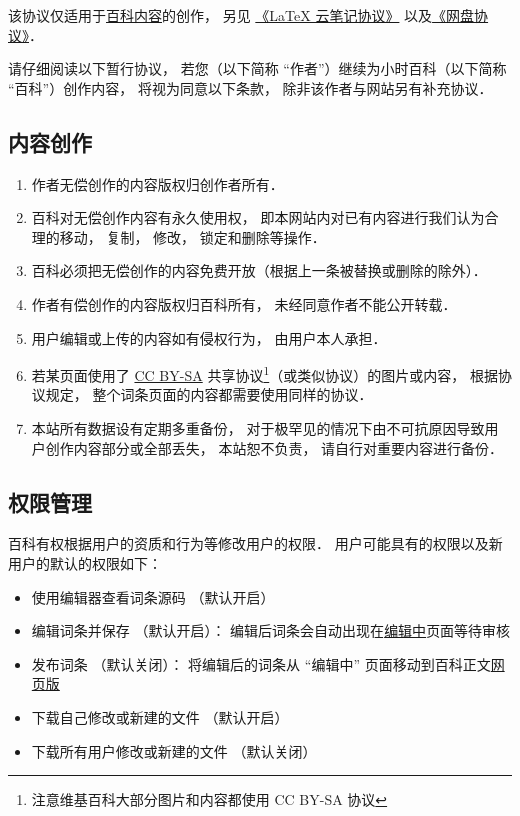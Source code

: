 
该协议仅适用于\href{http://wuli.wiki/online/}{百科内容}的创作， 另见 \href{http://wuli.wiki/online/NtLcns.html}{《LaTeX 云笔记协议》} 以及\href{http://www.example.com}{《网盘协议》}．

请仔细阅读以下暂行协议， 若您（以下简称 “作者”）继续为小时百科（以下简称 “百科”）创作内容， 将视为同意以下条款， 除非该作者与网站另有补充协议．

\subsection{内容创作}
\begin{enumerate}
\item 作者无偿创作的内容版权归创作者所有．
\item 百科对无偿创作内容有永久使用权， 即本网站内对已有内容进行我们认为合理的移动， 复制， 修改， 锁定和删除等操作．
\item 百科必须把无偿创作的内容免费开放（根据上一条被替换或删除的除外）．
\item 作者有偿创作的内容版权归百科所有， 未经同意作者不能公开转载．
\item 用户编辑或上传的内容如有侵权行为， 由用户本人承担．

\item 若某页面使用了 \href{https://creativecommons.org/licenses/by-sa/3.0/}{CC BY-SA} 共享协议\footnote{注意维基百科大部分图片和内容都使用 CC BY-SA 协议}（或类似协议）的图片或内容， 根据协议规定， 整个词条页面的内容都需要使用同样的协议．
\item 本站所有数据设有定期多重备份， 对于极罕见的情况下由不可抗原因导致用户创作内容部分或全部丢失， 本站恕不负责， 请自行对重要内容进行备份．
\end{enumerate}

\subsection{权限管理}
百科有权根据用户的资质和行为等修改用户的权限． 用户可能具有的权限以及新用户的默认的权限如下：
\begin{itemize}
\item 使用编辑器查看词条源码 （默认开启）
\item 编辑词条并保存 （默认开启）： 编辑后词条会自动出现在\href{http://wuli.wiki/changed}{编辑中}页面等待审核
\item 发布词条 （默认关闭）： 将编辑后的词条从 “编辑中” 页面移动到百科正文\href{http://wuli.wiki/online}{网页版}
\item 下载自己修改或新建的文件 （默认开启）
\item 下载所有用户修改或新建的文件 （默认关闭）
\end{itemize}
